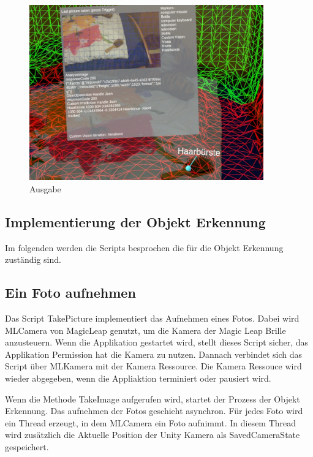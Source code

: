 \begin{figure}[H]
	\centering
	\includegraphics[width=0.9\textwidth]{images/ML_20201004_19.09.17_2.jpg}
	\caption[]{Ausgabe}
	\label{img:ausgabe}
\end{figure}


\subsection{Implementierung der Objekt Erkennung}

Im folgenden werden die Scripts besprochen die für die Objekt Erkennung zuständig sind.

\subsection{Ein Foto aufnehmen}


Das Script TakePicture implementiert das Aufnehmen eines Fotos. Dabei wird MLCamera von MagicLeap genutzt, um die Kamera der Magic Leap Brille anzusteuern. Wenn die Applikation gestartet wird, stellt dieses Script sicher, das Applikation Permission hat die Kamera zu nutzen. Dannach verbindet sich das Script über MLKamera mit der Kamera Ressource. 
Die Kamera Ressouce wird wieder abgegeben, wenn die Appliaktion terminiert oder pausiert wird.

Wenn die Methode TakeImage aufgerufen wird, startet der Prozess der Objekt Erkennung.
Das aufnehmen der Fotos geschieht asynchron. Für jedes Foto wird ein Thread erzeugt, in dem MLCamera ein Foto aufnimmt. In diesem Thread wird zusätzlich die Aktuelle Position der Unity Kamera als SavedCameraState gespeichert.

